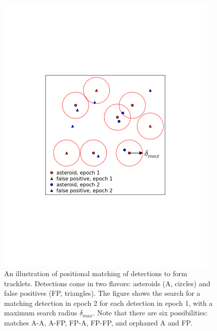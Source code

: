 \begin{figure}[t!]
\centering
\vskip -2.0in
\includegraphics[width=0.95\textwidth]{figures/TrackSlide2}
\vskip -2.2in
\caption{An illustration of positional matching of detections to form tracklets. 
Detections come in two flavors: asteroids (A, circles) and false positives (FP, triangles).
The figure shows the search for a matching detection in epoch 2 for each detection
in epoch 1, with a maximum search radius $\delta_{max}$. Note that there are six
possibilities: matches A-A, A-FP, FP-A, FP-FP, and orphaned A and FP. 
\label{fig:TrackSlide2}}
\end{figure}

